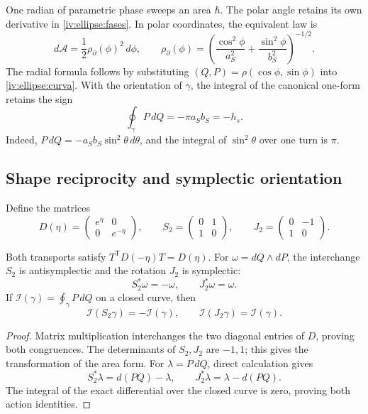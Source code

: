 One radian of parametric phase sweeps an area \(\hbar\). The polar
angle retains its own derivative in
\eqref{iv:ellipse:fases}. In polar coordinates, the equivalent
law is
\[
 d\mathcal A=\frac12\rho_{\partial}(\phi)^2\,d\phi,\qquad
 \rho_{\partial}(\phi)=
 \left(\frac{\cos^2\phi}{a_S^2}
       +\frac{\sin^2\phi}{b_S^2}\right)^{-1/2}.
\]
The radial formula follows by substituting
\((Q,P)=\rho(\cos\phi,\sin\phi)\) into
\eqref{iv:ellipse:curva}. With the orientation of
\(\gamma\), the integral of the canonical one-form retains
the sign
\begin{equation}
 \oint_\gamma P\,dQ=-\pi a_Sb_S=-h_s.
 \label{iv:ellipse:accion-orientada}
\end{equation}
Indeed, \(P\,dQ=-a_Sb_S\sin^2\theta\,d\theta\), and
the integral of \(\sin^2\theta\) over one turn is \(\pi\).

\subsection{Shape reciprocity and symplectic orientation}
\label{iv:ellipse:reciprocidad}

Define the matrices
\begin{equation}
 D(\eta)=\begin{pmatrix}e^\eta&0\\0&e^{-\eta}\end{pmatrix},
 \qquad
 S_2=\begin{pmatrix}0&1\\1&0\end{pmatrix},
 \qquad
 J_2=\begin{pmatrix}0&-1\\1&0\end{pmatrix}.
 \label{iv:ellipse:transportes}
\end{equation}

\begin{proposition}
\label{iv:ellipse:accion-reciproca}
Both transports satisfy
\(T^{\mathsf T}D(-\eta)T=D(\eta)\).
For \(\omega=dQ\wedge dP\), the interchange \(S_2\) is
antisymplectic and the rotation \(J_2\) is symplectic:
\[
 S_2^*\omega=-\omega,\qquad J_2^*\omega=\omega.
\]
If \(\mathcal I(\gamma)=\oint_\gamma P\,dQ\) on a
closed curve, then
\begin{equation}
 \mathcal I(S_2\gamma)=-\mathcal I(\gamma),\qquad
 \mathcal I(J_2\gamma)=\mathcal I(\gamma).
 \label{iv:ellipse:signos-accion}
\end{equation}
\end{proposition}
\begin{proof}
Matrix multiplication interchanges the two diagonal entries
of \(D\), proving both congruences.
The determinants of \(S_2,J_2\) are \(-1,1\);
this gives the transformation of the area form.
For \(\lambda=P\,dQ\), direct calculation gives
\[
 S_2^*\lambda=d(PQ)-\lambda,\qquad
 J_2^*\lambda=\lambda-d(PQ).
\]
The integral of the exact differential over the closed curve
is zero, proving both action identities.
\end{proof}

